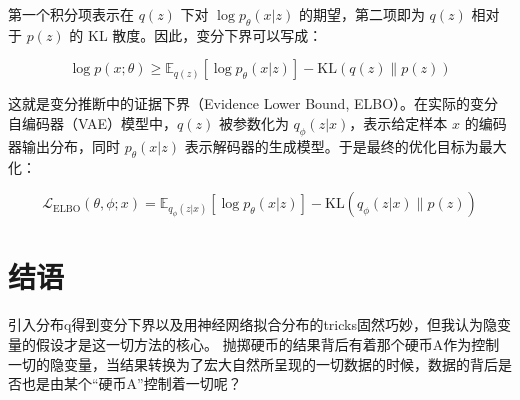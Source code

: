 \documentclass[12pt,a4paper]{article}
\begin{document}
第一个积分项表示在 $q(z)$ 下对 $\log p_\theta(x|z)$ 的期望，第二项即为 $q(z)$ 相对于 $p(z)$ 的 KL 散度。因此，变分下界可以写成：

\begin{equation}
\log p(x; \theta) \geq \mathbb{E}_{q(z)}[\log p_\theta(x|z)] - \mathrm{KL}(q(z) \| p(z)) \label{47}
\end{equation}

这就是变分推断中的证据下界（Evidence Lower Bound, ELBO）。在实际的变分自编码器（VAE）模型中，$q(z)$ 被参数化为 $q_\phi(z|x)$，表示给定样本 $x$ 的编码器输出分布，同时 $p_\theta(x|z)$ 表示解码器的生成模型。于是最终的优化目标为最大化：

\begin{equation}
\mathcal{L}_{\text{ELBO}}(\theta, \phi; x) = \mathbb{E}_{q_\phi(z|x)}[\log p_\theta(x|z)] - \mathrm{KL}(q_\phi(z|x) \| p(z)) \label{48}
\end{equation}

\section{结语}
引入分布q得到变分下界以及用神经网络拟合分布的tricks固然巧妙，但我认为隐变量的假设才是这一切方法的核心。
抛掷硬币的结果背后有着那个硬币A作为控制一切的隐变量，当结果转换为了宏大自然所呈现的一切数据的时候，数据的背后是否也是由某个“硬币A”控制着一切呢？
\nocite{*}  %





\end{document}

